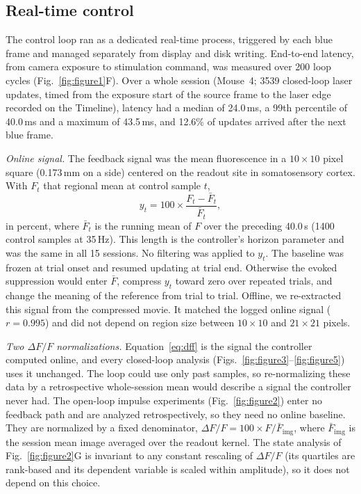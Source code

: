 \subsection*{Real-time control}

The control loop ran as a dedicated real-time process, triggered by each blue frame and managed separately from display and disk writing.
End-to-end latency, from camera exposure to stimulation command, was measured over 200 loop cycles (Fig.~\ref{fig:figure1}F).
Over a whole session (Mouse~4; 3539 closed-loop laser updates, timed from the exposure start of the source frame to the laser edge recorded on the Timeline), latency had a median of 24.0\,ms, a 99th percentile of 40.0\,ms and a maximum of 43.5\,ms, and 12.6\% of updates arrived after the next blue frame.

\emph{Online signal.} The feedback signal was the mean fluorescence in a $10 \times 10$ pixel square (0.173\,mm on a side) centered on the readout site in somatosensory cortex.
With $F_t$ that regional mean at control sample $t$,
%
\begin{equation}
    y_{t} = 100 \times \frac{F_{t} - \bar{F}_{t}}{\bar{F}_{t}},
    \label{eq:dff}
\end{equation}
%
in percent, where $\bar{F}_{t}$ is the running mean of $F$ over the preceding 40.0\,s (1400 control samples at 35\,Hz).
This length is the controller's horizon parameter and was the same in all 15 sessions.
No filtering was applied to $y_t$.
The baseline was frozen at trial onset and resumed updating at trial end.
Otherwise the evoked suppression would enter $\bar F$, compress $y_t$ toward zero over repeated trials, and change the meaning of the reference from trial to trial.
Offline, we re-extracted this signal from the compressed movie.
It matched the logged online signal ($r = 0.995$) and did not depend on region size between $10 \times 10$ and $21 \times 21$ pixels.

\emph{Two $\Delta F/F$ normalizations.} Equation~\eqref{eq:dff} is the signal the controller computed online, and every closed-loop analysis (Figs.~\ref{fig:figure3}--\ref{fig:figure5}) uses it unchanged.
The loop could use only past samples, so re-normalizing these data by a retrospective whole-session mean would describe a signal the controller never had.
The open-loop impulse experiments (Fig.~\ref{fig:figure2}) enter no feedback path and are analyzed retrospectively, so they need no online baseline.
They are normalized by a fixed denominator, $\Delta F/F = 100 \times F / \bar{F}_{\mathrm{img}}$, where $\bar{F}_{\mathrm{img}}$ is the session mean image averaged over the readout kernel.
The state analysis of Fig.~\ref{fig:figure2}G is invariant to any constant rescaling of $\Delta F/F$ (its quartiles are rank-based and its dependent variable is scaled within amplitude), so it does not depend on this choice.

